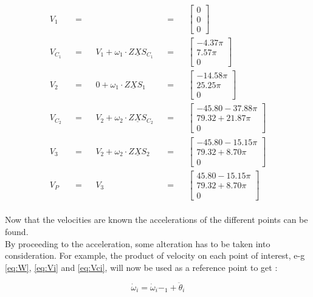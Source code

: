 \begin{align}
    V_1&&=&& &&=&&
\left[\begin{matrix}
    0\\
    0\\
    0
\end{matrix}\right]\\ V_C_1&&=&&V_1+\omega_1\cdot Z\underline{X}S_C_1&&=&&\left[\begin{matrix}
    -4.37\pi\\
    7.57\pi\\
    0
\end{matrix}\right]\\
    V_2&&=&&0+\omega_1\cdot Z\underline{X}S_1&&=&&
\left[\begin{matrix}
    -14.58\pi\\
    25.25\pi\\
    0
\end{matrix}\right]\\ V_C_2&&=&&V_2+\omega_2\cdot Z\underline{X}S_C_2&&=&&
\left[\begin{matrix}
   -45.80-37.88\pi \\
    79.32+21.87\pi\\
    0
\end{matrix}\right]\\
    V_3&&=&&V_2+\omega_2\cdot Z\underline{X}S_2&&=&&
\left[\begin{matrix}
    -45.80-15.15\pi\\
    79.32+8.70\pi\\
    0
\end{matrix}\right]\\ V_P&&=&&V_3&&=&&\left[\begin{matrix}
    45.80-15.15\pi\\
    79.32+8.70\pi\\
    0
\end{matrix}\right]
\end{align}
\\
Now that the velocities are known the accelerations of the different points can be found.\\
By proceeding to the acceleration, some alteration has to be taken into consideration. For example, the product of velocity on each point of interest, e-g \ref{eq:W}, \ref{eq:Vi} and \ref{eq:Vci}, will now be used as a reference point to get :

\begin{equation}
\dot\omega_i=\dot\omega_i-_1+\ddot\theta_i
\end{equation}

